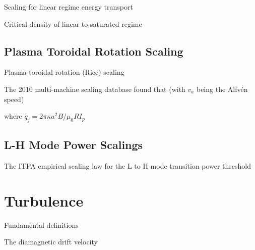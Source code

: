 \noindent Scaling for linear regime energy transport \cite{iter}

\noindent Critical density of linear to saturated regime \cite{iter}

\subsection{Plasma Toroidal Rotation Scaling}

Plasma toroidal rotation (Rice) scaling \cite{rice}

\noindent The 2010 multi-machine scaling database found that (with $v_{a}$ being the Alfv\'en speed) \cite{rice}

\indent where $q_{j} =2 \pi \kappa a^{2} B/\mu_{0} R I_{p}$

\subsection{L-H Mode Power Scalings}
\noindent
The ITPA empirical scaling law for the L to H mode transition power threshold \cite{martin} %

\section{Turbulence}

Fundamental definitions 

\noindent The diamagnetic drift velocity 

